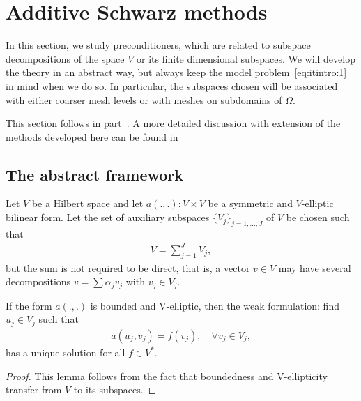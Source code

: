 
\section{Additive Schwarz methods}

\begin{intro}
  In this section, we study preconditioners, which are related to
  subspace decompositions of the space $V$ or its finite dimensional
  subspaces. We will develop the theory in an abstract way, but always
  keep the model problem~\eqref{eq:itintro:1} in mind when we do so. In
  particular, the subspaces chosen will be associated with either
  coarser mesh levels or with meshes on subdomains of $\Omega$.
  
  This section follows in part~\cite[Chapter 7]{BrennerScott02}. A
  more detailed discussion with extension of the methods developed
  here can be found in~\cite{ToselliWidlund05}
\end{intro}

\subsection{The abstract framework}

\begin{intro}
  Let $V$ be a Hilbert space and let $a(.,.): V\times V$ be a
  symmetric and $V$-elliptic bilinear form. Let the set of auxiliary
  subspaces $\{V_j\}_{j=1,\dots,J}$ of $V$ be chosen such that
  \begin{gather*}
    V = \sum_{j=1}^J V_j,
  \end{gather*}
  but the sum is not required to be direct, that is, a vector $v\in V$
  may have several decompositions $v = \sum \alpha_j v_j$ with $v_j\in
  V_j$.
\end{intro}

\begin{lemma}
  \label{lemma:schwarz:1}
  If the form $a(.,.)$ is bounded and V-elliptic, then the weak
  formulation: find $u_j\in V_j$ such that
  \begin{gather}
    \label{eq:schwarz:1}
    a(u_j,v_j) = f(v_j),
    \quad\forall v_j\in V_j,
  \end{gather}
  has a unique solution for all $f\in V^*$.
\end{lemma}

\begin{proof}
  This lemma follows from the fact that boundedness and V-ellipticity
  transfer from $V$ to its subspaces.
\end{proof}

